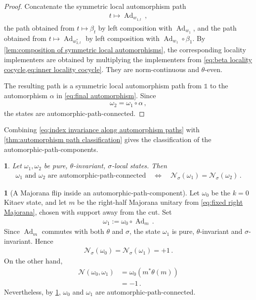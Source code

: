 \documentclass[a4paper,10pt]{article}
\numberwithin{equation}{section}
\theoremstyle{plain}
\theoremstyle{plain}
\theoremstyle{plain}
\newtheorem{cor}[cor]{\protect\corollaryname}
\theoremstyle{plain}
\theoremstyle{plain}
\theoremstyle{remark}
\theoremstyle{definition}
\newtheorem{example}[example]{\protect\examplename}
\providecommand{\corollaryname}{Corollary}
\providecommand{\examplename}{Example}
\newcommand{\calN}{\mathcal{N}}
\newcommand{\Ad}[1]{\operatorname{Ad}_{#1}}
\newcommand{\Id}{\mathds{1}}
\newcommand{\eq}[1]{\begin{align*}#1\end{align*}}
\newcommand{\eql}[1]{\begin{align}#1\end{align}}
\newcommand{\br}[1]{\left(#1\right)}
\begin{document}
\begin{proof}
Concatenate the symmetric local automorphism path
\eq{
    t\longmapsto\Ad{w_{1,t}}\, ,
}
the path obtained from \(t\mapsto\beta_t\) by left composition with
\(\Ad{w_1}\), and the path obtained from
\(t\mapsto\Ad{w_{2,t}^*}\) by left composition with
\(\Ad{w_1}\circ\beta_1\). By
\cref{lem:composition of symmetric local automorphisms}, the
corresponding locality implementers are obtained by multiplying the
implementers from
\cref{eq:beta locality cocycle,eq:inner locality cocycle}. They are
norm-continuous and \(\theta\)-even.

The resulting path is a symmetric local automorphism path from
\(\Id\) to the automorphism \(\alpha\) in
\cref{eq:final automorphism}. Since
\eq{
    \omega_2
    =
    \omega_1\circ\alpha\, ,
}
the states are automorphic-path-connected.
\end{proof}

Combining \cref{eq:index invariance along automorphism paths} with
\cref{thm:automorphism path classification} gives the classification
of the automorphic-path-components.

\begin{cor}
\label{cor:index classifies automorphism path components}
Let \(\omega_1,\omega_2\) be pure, \(\theta\)-invariant,
\(\sigma\)-local states. Then
\eql{
    \omega_1
    \text{ and }
    \omega_2
    \text{ are }
    \text{automorphic-path-connected}
    \quad\Longleftrightarrow\quad
    \calN_\sigma(\omega_1)
    =
    \calN_\sigma(\omega_2)\,.
}
\end{cor}

\begin{example}[A Majorana flip inside an automorphic-path-component]
\label{ex:majorana flip within automorphism path component}
Let \(\omega_0\) be the \(k=0\) Kitaev state, and let \(m\) be the
right-half Majorana unitary from
\cref{eq:fixed right Majorana}, chosen with support away from the cut.
Set
\eq{
    \omega_1
    :=
    \omega_0\circ\Ad{m}\,.
}
Since \(\Ad{m}\) commutes with both \(\theta\) and \(\sigma\), the
state \(\omega_1\) is pure, \(\theta\)-invariant and
\(\sigma\)-invariant. Hence
\eq{
    \calN_\sigma(\omega_0)
    =
    \calN_\sigma(\omega_1)
    =
    +1\,.
}
On the other hand,
\eq{
    \calN(\omega_0,\omega_1)
    &=
    \omega_0\br{m^*\theta(m)}\\
    &=
    -1\,.
}
Nevertheless, by
\cref{cor:index classifies automorphism path components},
\(\omega_0\) and \(\omega_1\) are
automorphic-path-connected.
\end{example}
\end{document}
